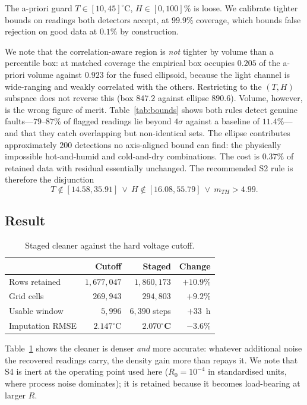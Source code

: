 \documentclass[conference]{IEEEtran}
\begin{document}
The a-priori guard $T \in [10,45]^\circ$C, $H \in [0,100]\%$ is loose. We
calibrate tighter bounds on readings both detectors accept, at $99.9\%$
coverage, which bounds false rejection on good data at $0.1\%$ by construction.

We note that the correlation-aware region is \emph{not} tighter by volume than
a percentile box: at matched coverage the empirical box occupies $0.205$ of the
a-priori volume against $0.923$ for the fused ellipsoid, because the light
channel is wide-ranging and weakly correlated with the others. Restricting to
the $(T,H)$ subspace does not reverse this (box $847.2$ against ellipse
$890.6$). Volume, however, is the wrong figure of merit.
Table~\ref{tab:bounds} shows both rules detect genuine faults---$79$--$87\%$ of
flagged readings lie beyond $4\sigma$ against a baseline of $11.4\%$---and that
they catch overlapping but non-identical sets. The ellipse contributes
approximately $200$ detections no axis-aligned bound can find: the physically
impossible hot-and-humid and cold-and-dry combinations. The cost is $0.37\%$ of
retained data with residual essentially unchanged. The recommended S2 rule is
therefore the disjunction
\begin{equation}
T \notin [14.58, 35.91]\ \lor\ H \notin [16.08, 55.79]\ \lor\ m_{TH} > 4.99 .
\end{equation}

\subsection{Result}

\begin{table}[t]
\caption{Staged cleaner against the hard voltage cutoff.}
\label{tab:staged}
\centering
\begin{tabular}{lrrr}
\toprule
 & Cutoff & Staged & Change \\
\midrule
Rows retained     & $1{,}677{,}047$ & $1{,}860{,}173$ & $+10.9\%$ \\
Grid cells        & $269{,}943$ & $294{,}803$ & $+9.2\%$ \\
Usable window     & $5{,}996$ & $6{,}390$ steps & $+33$~h \\
Imputation RMSE   & $2.147^\circ$C & $\mathbf{2.070^\circ}$\textbf{C} & $-3.6\%$ \\
\bottomrule
\end{tabular}
\end{table}

Table~\ref{tab:staged} shows the cleaner is denser \emph{and} more accurate:
whatever additional noise the recovered readings carry, the density gain more
than repays it. We note that S4 is inert at the operating point used here
($R_0 = 10^{-4}$ in standardised units, where process noise dominates); it is
retained because it becomes load-bearing at larger $R$.
\end{document}
